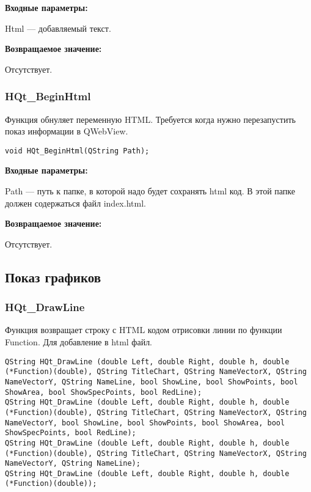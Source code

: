 \documentclass[a4paper,12pt]{article}
\begin{document}
\textbf{Входные параметры:}

Html --- добавляемый текст.

\textbf{Возвращаемое значение:}

Отсутствует.


\subsubsection{HQt\_BeginHtml}\label{HQt_BeginHtml}

Функция обнуляет переменную HTML. Требуется когда нужно перезапустить показ информации в QWebView.


\begin{lstlisting}[label=code_syntax_HQt_BeginHtml,caption=Синтаксис]
void HQt_BeginHtml(QString Path);
\end{lstlisting}

\textbf{Входные параметры:}

Path --- путь к папке, в которой надо будет сохранять html код. В этой папке должен содержаться файл index.html.

\textbf{Возвращаемое значение:}

Отсутствует.


\subsection{Показ графиков}

\subsubsection{HQt\_DrawLine}\label{HQt_DrawLine}

Функция возвращает строку с HTML кодом отрисовки линии по функции Function. Для добавление в html файл.


\begin{lstlisting}[label=code_syntax_HQt_DrawLine,caption=Синтаксис]
QString HQt_DrawLine (double Left, double Right, double h, double (*Function)(double), QString TitleChart, QString NameVectorX, QString NameVectorY, QString NameLine, bool ShowLine, bool ShowPoints, bool ShowArea, bool ShowSpecPoints, bool RedLine);
QString HQt_DrawLine (double Left, double Right, double h, double (*Function)(double), QString TitleChart, QString NameVectorX, QString NameVectorY, bool ShowLine, bool ShowPoints, bool ShowArea, bool ShowSpecPoints, bool RedLine);
QString HQt_DrawLine (double Left, double Right, double h, double (*Function)(double), QString TitleChart, QString NameVectorX, QString NameVectorY, QString NameLine);
QString HQt_DrawLine (double Left, double Right, double h, double (*Function)(double));
\end{lstlisting}
\end{document}
